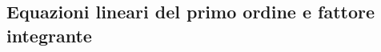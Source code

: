 \subsection{Equazioni lineari del primo ordine e fattore integrante}
\label{sec:esercizi-equazioni-differenziali-equazioni-lineari-primo-ordine}
